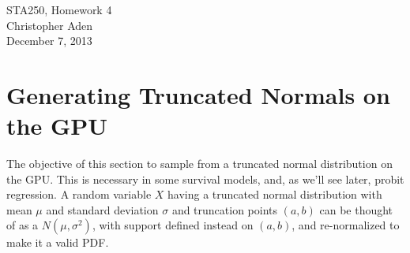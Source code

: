 \documentclass[12pt]{article}
\begin{document}
\begin{center}
STA250, Homework 4 \\
Christopher Aden\\
December 7, 2013\
\end{center}

\section{Generating Truncated Normals on the GPU}
The objective of this section to sample from a truncated normal distribution on the GPU. This is necessary in some survival models, and, as we'll see later, probit regression. A random variable $X$ having a truncated normal distribution with mean $\mu$ and standard deviation $\sigma$ and truncation points $(a,b)$ can be thought of as a $N(\mu, \sigma^2)$, with support defined instead on $(a,b)$, and re-normalized to make it a valid PDF.
\end{document}
